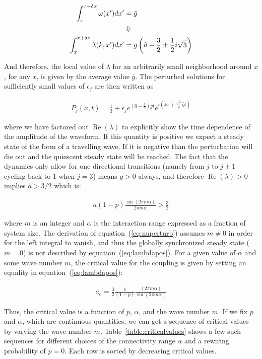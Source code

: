 \begin{align}
  \int_x^{x+\delta x} \omega(x')dx' &= \bar{g} \notag\\
  & \Downarrow \notag\\
  \int_x^{x+\delta x} \lambda(k,x')dx' &= \bar{g} \left( \hat{a} - \frac{3}{2} \pm \frac{1}{2}i\sqrt{3} \right)
\end{align}

And therefore, the local value of $\lambda$ for an arbitrarily small neighborhood around $x$, for any $x$, is given by the average
value $\bar{g}$. The perturbed solutions for sufficiently small values of $\epsilon_j$ are then written as

\begin{align}
  P_j(x,t) = \frac{1}{3} + \epsilon_j e^{\left( \hat{a} - \frac{3}{2} \right)\bar{g}t} e^{i\left(kx + \frac{\sqrt{3}}{2}\bar{g}t\right)}
\end{align}

\noindent where we have factored out $\operatorname{Re}(\lambda)$ to explicitly show the time dependence of the amplitude of the
waveform. If this quantity is positive we expect a steady state of the form of a travelling wave. If it is negative than the
perturbation will die out and the quiescent steady state will be reached. The fact that the dynamics only allow for one directional
transitions (namely from $j$ to $j+1$ cycling back to 1 when $j=3$) means $\bar{g}>0$ always, and therefore
$\operatorname{Re}(\lambda)>0$ implies $\hat{a} > 3/2$ which is:

\begin{align}
  a(1-p)\frac{\sin(2\pi m\alpha)}{2\pi m\alpha} > \frac{3}{2}
  \label{eq:lambdapos}
\end{align}

\noindent where $m$ is an integer and $\alpha$ is the interaction range expressed as a fraction of system size. The derivation of
equation~(\ref{eq:nuperturb}) assumes $m\neq 0$ in order for the left integral to vanish, and thus the globally synchronized steady
state ($m=0$) is not described by equation~(\ref{eq:lambdapos}). For a given value of $\alpha$ and some wave number $m$, the critical
value for the coupling is given by setting an equality in equation~(\ref{eq:lambdapos}):

\begin{align}
  a_c = \frac{3}{2}\frac{1}{(1-p)}\frac{(2\pi m\alpha)}{\sin(2\pi m\alpha)}
\end{align}

Thus, the critical value is a function of $p$, $\alpha$, and the wave number $m$. If we fix $p$ and $\alpha$, which are continuous
quantities, we can get a sequence of critical values by varying the wave number $m$. Table~\ref{table:criticalvalues} shows a few such
sequences for different choices of the connectivity range $\alpha$ and a rewiring probability of $p=0$. Each row is sorted by
decreasing critical values.


